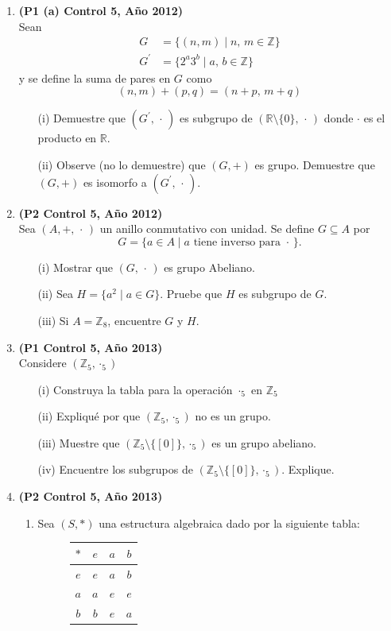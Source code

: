 \documentclass[11pt]{article}
\newcommand{\R}{\mathbb R}
\newcommand{\Z}{\mathbb Z}
\theoremstyle{plain}
\theoremstyle{definition}
\begin{document}
\begin{enumerate}
\item \textbf{(P1 (a) Control 5, Año 2012)}\\
Sean 
\begin{align*}
G&=\{(n,m)\;|\; n,\,m\in\Z\} \\
G^{\prime}&=\{2^a 3^b \;|\;a,\,b\in\Z \}
\end{align*}
y se define la suma de pares en $G$ como
$$(n,m)+(p,q)=(n+p,\,m+q)$$
\begin{enumerate}
\item[(i)] Demuestre que $(G^{\prime},\,\cdot\,)$ es subgrupo de $(\R\setminus\{0\},\,\cdot\,)$ donde $\cdot$ es el producto en $\R$.
\item[(ii)] Observe (no lo demuestre) que $(G,+)$ es grupo. Demuestre que $(G,+)$ es isomorfo a $(G^{\prime},\,\cdot\,)$.
\end{enumerate}

\item \textbf{(P2 Control 5, Año 2012)}\\
Sea $(A,+,\,\cdot\,)$ un anillo conmutativo con unidad. Se define $G\subseteq A$ por
$$G=\{a\in A\;|\; a \mbox{ tiene inverso para } \cdot\,\}.$$
\begin{enumerate}
\item[(i)] Mostrar que $(G,\,\cdot \,)$ es grupo Abeliano.
\item[(ii)] Sea $H=\{a^2\;|\;a\in G\}$. Pruebe que $H$ es subgrupo de $G$.
\item[(iii)] Si $A=\Z_8$, encuentre $G$ y $H$.
\end{enumerate}

\item \textbf{(P1 Control 5, Año 2013)}\\
Considere $(\Z_{5},\cdot_{5})$
\begin{enumerate}
\item[(i)] Construya la tabla para la operación $\cdot_{5}$ en $\Z_5$
\item[(ii)] Expliqué por que $(\Z_5,\cdot_5)$ no es un grupo.
\item[(iii)] Muestre que $(\Z_5 \setminus \{[0]\}, \cdot_5)$ es un grupo abeliano.
\item[(iv)] Encuentre los subgrupos de $(\Z_5\setminus\{[0]\},\cdot_5)$. Explique.
\end{enumerate}

\item \textbf{(P2 Control 5, Año 2013)}
\begin{enumerate}
\item Sea $(S,\ast)$ una estructura algebraica dado por la siguiente tabla:
\begin{figure}[h]
\centering
\begin{tabular}{c|ccc}
$\ast$ & $e$ & $a$ & $b$ \\ \hline
$e$ & $e$ & $a$ & $b$\\
$a$ & $a$ & $e$ & $e$\\
$b$ & $b$ & $e$ & $a$
\end{tabular}
\end{figure}


\end{enumerate}
\end{enumerate}
\end{document}
